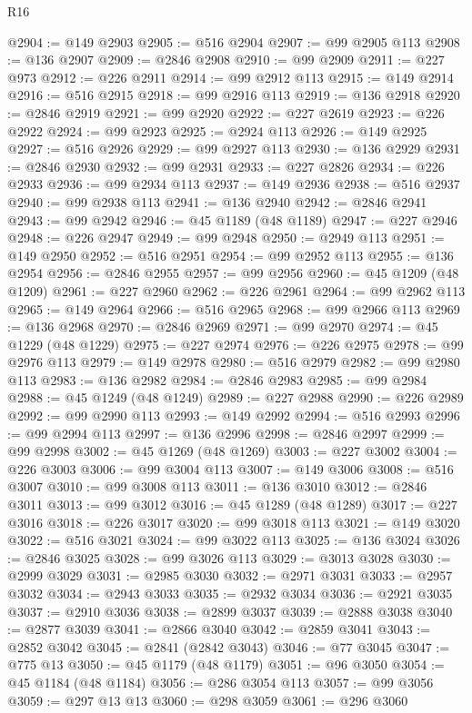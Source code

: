 \begin{lexlean}{R16}
\begin{coremodule}
@2904 := @149 @2903
@2905 := @516 @2904
@2907 := @99 @2905 @113
@2908 := @136 @2907
@2909 := @2846 @2908
@2910 := @99 @2909
@2911 := @227 @973
@2912 := @226 @2911
@2914 := @99 @2912 @113
@2915 := @149 @2914
@2916 := @516 @2915
@2918 := @99 @2916 @113
@2919 := @136 @2918
@2920 := @2846 @2919
@2921 := @99 @2920
@2922 := @227 @2619
@2923 := @226 @2922
@2924 := @99 @2923
@2925 := @2924 @113
@2926 := @149 @2925
@2927 := @516 @2926
@2929 := @99 @2927 @113
@2930 := @136 @2929
@2931 := @2846 @2930
@2932 := @99 @2931
@2933 := @227 @2826
@2934 := @226 @2933
@2936 := @99 @2934 @113
@2937 := @149 @2936
@2938 := @516 @2937
@2940 := @99 @2938 @113
@2941 := @136 @2940
@2942 := @2846 @2941
@2943 := @99 @2942
@2946 := @45 @1189 (@48 @1189)
@2947 := @227 @2946
@2948 := @226 @2947
@2949 := @99 @2948
@2950 := @2949 @113
@2951 := @149 @2950
@2952 := @516 @2951
@2954 := @99 @2952 @113
@2955 := @136 @2954
@2956 := @2846 @2955
@2957 := @99 @2956
@2960 := @45 @1209 (@48 @1209)
@2961 := @227 @2960
@2962 := @226 @2961
@2964 := @99 @2962 @113
@2965 := @149 @2964
@2966 := @516 @2965
@2968 := @99 @2966 @113
@2969 := @136 @2968
@2970 := @2846 @2969
@2971 := @99 @2970
@2974 := @45 @1229 (@48 @1229)
@2975 := @227 @2974
@2976 := @226 @2975
@2978 := @99 @2976 @113
@2979 := @149 @2978
@2980 := @516 @2979
@2982 := @99 @2980 @113
@2983 := @136 @2982
@2984 := @2846 @2983
@2985 := @99 @2984
@2988 := @45 @1249 (@48 @1249)
@2989 := @227 @2988
@2990 := @226 @2989
@2992 := @99 @2990 @113
@2993 := @149 @2992
@2994 := @516 @2993
@2996 := @99 @2994 @113
@2997 := @136 @2996
@2998 := @2846 @2997
@2999 := @99 @2998
@3002 := @45 @1269 (@48 @1269)
@3003 := @227 @3002
@3004 := @226 @3003
@3006 := @99 @3004 @113
@3007 := @149 @3006
@3008 := @516 @3007
@3010 := @99 @3008 @113
@3011 := @136 @3010
@3012 := @2846 @3011
@3013 := @99 @3012
@3016 := @45 @1289 (@48 @1289)
@3017 := @227 @3016
@3018 := @226 @3017
@3020 := @99 @3018 @113
@3021 := @149 @3020
@3022 := @516 @3021
@3024 := @99 @3022 @113
@3025 := @136 @3024
@3026 := @2846 @3025
@3028 := @99 @3026 @113
@3029 := @3013 @3028
@3030 := @2999 @3029
@3031 := @2985 @3030
@3032 := @2971 @3031
@3033 := @2957 @3032
@3034 := @2943 @3033
@3035 := @2932 @3034
@3036 := @2921 @3035
@3037 := @2910 @3036
@3038 := @2899 @3037
@3039 := @2888 @3038
@3040 := @2877 @3039
@3041 := @2866 @3040
@3042 := @2859 @3041
@3043 := @2852 @3042
@3045 := @2841 (@2842 @3043)
@3046 := @77 @3045
@3047 := @775 @13
@3050 := @45 @1179 (@48 @1179)
@3051 := @96 @3050
@3054 := @45 @1184 (@48 @1184)
@3056 := @286 @3054 @113
@3057 := @99 @3056
@3059 := @297 @13 @13
@3060 := @298 @3059
@3061 := @296 @3060

\end{coremodule}
\end{lexlean}
